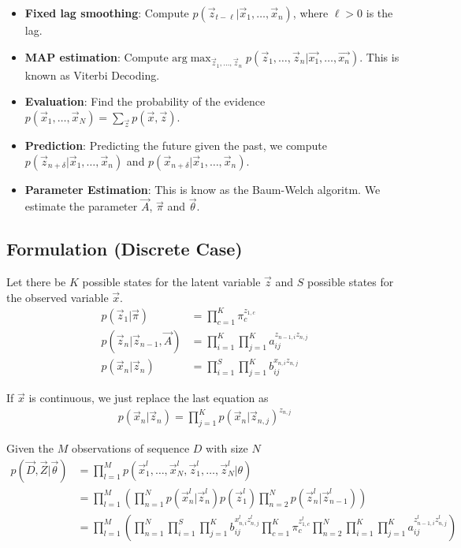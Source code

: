 \documentclass[12pt,twoside]{article}
\begin{document}
\begin{enumerate}
\begin{itemize}
			\item \textbf{Fixed lag smoothing}: Compute  $p(\vec{z}_{t-\ell} \vert \vec{x}_1,\ldots, \vec{x}_n)$, where  $\ell >0$ is the lag. 
			
			\item \textbf{MAP estimation}: Compute $\text{arg} \max_{\vec{z}_1,\ldots, \vec{z}_n} p(\vec{z}_{1},\ldots,\vec{z}_{n} \vert \vec{x_1}, \ldots, \vec{x_n}) $. This is known as Viterbi Decoding.
			
			\item \textbf{Evaluation}: Find the probability of the evidence $p(\vec{x}_1,\ldots, \vec{x}_N)= \sum_{\vec{z}} p(\vec{x}, \vec{z})$.			
			
			\item \textbf{Prediction}: Predicting the future given the past, we compute $p(\vec{z}_{n+\delta}\vert \vec{x}_1, \ldots, \vec{x}_n)$ and $p(\vec{x}_{n+\delta}\vert \vec{x}_1, \ldots, \vec{x}_n)$.
			
			\item \textbf{Parameter Estimation}: This is know as the Baum-Welch algoritm. We estimate the parameter $\vec{A}$, $\vec{\pi}$ and $\vec{\theta}$.
		\end{itemize}

\end{enumerate}


\subsection{Formulation (Discrete Case)}
Let there be $K$ possible states for the latent variable $\vec{z}$ and $S$ possible states for the observed variable $\vec{x}$.
\begin{align*}
	p(\vec{z}_1\vert \vec{\pi}) 						&= \prod_{c=1}^K \pi_c^{z_{1,c}}\\
	p(\vec{z}_n \vert \vec{z}_{n-1}, \vec{A})	&= \prod_{i=1}^K \prod_{j=1}^K a_{ij}^{z_{n-1, i}z_{n, j}}\\
	p(\vec{x}_n \vert \vec{z}_n)					 	&= \prod_{i=1}^S \prod_{j=1}^K b_{ij}^{x_{n,i}z_{n,j}}
\end{align*}

If $\vec{x}$ is continuous, we just replace the last equation as
\begin{align*}
	p(\vec{x}_n \vert \vec{z}_n)	 = \prod_{j=1}^K p(\vec{x}_n \vert \vec{z}_{n, j})^{z_{n,j}}
\end{align*}

Given the $M$ observations of sequence $D$ with size $N$
\begin{align*}
	p(\vec{D}, \vec{Z}\vert \vec{\theta})
	& =\prod_{l=1}^M p(\vec{x}_1^l,\ldots, \vec{x}_N^l, \vec{z}_1^l,\ldots, \vec{z}_N^l \vert \theta)\\
	& = \prod_{l=1}^M \left(\prod_{n=1}^N p(\vec{x}_n^l \vert \vec{z}_n^l) p(\vec{z}_1^l)\prod_{n=2}^N p(\vec{z}_n^l \vert \vec{z}_{n-1}^l) \right)\\
	& = \prod_{l=1}^M \left(\prod_{n=1}^N \prod_{i=1}^S \prod_{j=1}^K b_{ij}^{x_{n,i}^lz_{n,j}^l} \prod_{c=1}^K \pi_c^{z_{1,c}^l}\prod_{n=2}^N \prod_{i=1}^K \prod_{j=1}^K a_{ij}^{z_{n-1, i}^l z_{n, j}^l} \right)\\
\end{align*}
\end{document}
